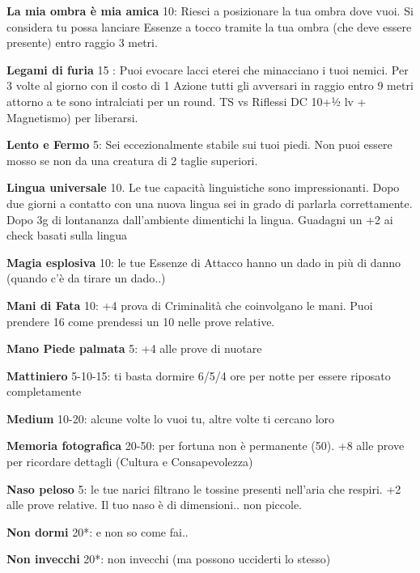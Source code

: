 \documentclass[a4paper,11pt,twoside,openany]{book}
\begin{document}
\textbf{La mia ombra è mia amica} 10: Riesci a posizionare la tua ombra dove vuoi. Si considera tu possa lanciare Essenze a tocco tramite la tua ombra (che deve essere presente) entro raggio 3 metri.

\textbf{Legami di furia} 15 : Puoi evocare lacci eterei che minacciano i tuoi nemici. Per 3 volte al giorno con il costo di 1 Azione tutti gli avversari in raggio entro 9 metri attorno a te sono intralciati per un round. TS vs Riflessi DC 10+½ lv + Magnetismo) per liberarsi.

\textbf{Lento e Fermo} 5: Sei eccezionalmente stabile sui tuoi piedi. Non puoi essere mosso se non da una creatura di 2 taglie superiori.

\textbf{Lingua universale} 10. Le tue capacità linguistiche sono impressionanti. Dopo due giorni a contatto con una nuova lingua sei in grado di parlarla correttamente. Dopo 3g di lontananza dall'ambiente dimentichi la lingua. Guadagni un +2 ai check basati sulla lingua

\textbf{Magia esplosiva} 10: le tue Essenze di Attacco hanno un dado in più di danno (quando c'è da tirare un dado..)

\textbf{Mani di Fata} 10: +4 prova di Criminalità che coinvolgano le mani. Puoi prendere 16 come prendessi un 10 nelle prove relative.

\textbf{Mano Piede palmata} 5: +4 alle prove di nuotare

\textbf{Mattiniero} 5-10-15: ti basta dormire 6/5/4 ore per notte
per essere riposato completamente

\textbf{Medium} 10-20: alcune volte lo vuoi tu, altre volte ti cercano loro

\textbf{Memoria fotografica} 20-50: per fortuna non è permanente (50). +8 alle prove per ricordare dettagli (Cultura e Consapevolezza)

\textbf{Naso peloso} 5: le tue narici filtrano le tossine presenti nell'aria che respiri. +2 alle prove relative. Il tuo naso è di dimensioni.. non piccole.

\textbf{Non dormi} 20{*}: e non so come fai..

\textbf{Non invecchi} 20{*}: non invecchi (ma possono ucciderti lo stesso)
\end{document}
